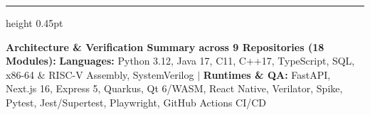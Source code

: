 \documentclass[a4paper]{article}
\begin{document}
\vspace{4.0pt}
{\color{black!35}\hrule height 0.45pt}
\vspace{3.0pt}
{\centering\fontsize{7.5}{9.2}\selectfont
\textbf{Architecture \& Verification Summary across 9 Repositories (18 Modules):} \enspace
\textbf{Languages:} Python 3.12, Java 17, C11, C++17, TypeScript, SQL, x86-64 \& RISC-V Assembly, SystemVerilog \enspace$\vert$\enspace
\textbf{Runtimes \& QA:} FastAPI, Next.js 16, Express 5, Quarkus, Qt 6/WASM, React Native, Verilator, Spike, Pytest, Jest/Supertest, Playwright, GitHub Actions CI/CD\par}
\end{document}
